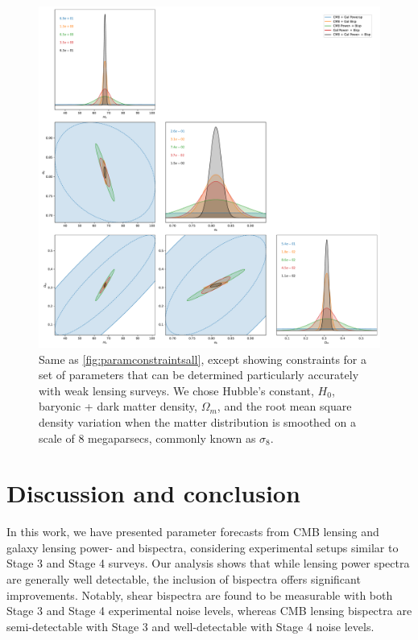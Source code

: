 \documentclass[11pt]{article} %
\begin{document}
\begin{figure}
    \centering
    \includegraphics[width=\textwidth]{figures/param_constraints_tight.pdf}
    \caption{Same as \ref{fig:paramconstraintsall}, except showing constraints for a set of parameters that can be determined particularly accurately with weak lensing surveys. We chose Hubble's constant, $H_0$, baryonic + dark matter density, $\Omega_m$, and the root mean square density variation when the matter distribution is smoothed on a scale of 8 megaparsecs, commonly known as $\sigma_8$.}
    \label{fig:paramconstraintstight}
\end{figure}

\pagebreak



\section{Discussion and conclusion}\label{sec:discussion}
In this work, we have presented parameter forecasts from CMB lensing and galaxy lensing power- and bispectra, considering experimental setups similar to Stage 3 and Stage 4 surveys. Our analysis shows that while lensing power spectra are generally well detectable, the inclusion of bispectra offers significant improvements. Notably, shear bispectra are found to be measurable with both Stage 3 and Stage 4 experimental noise levels, whereas CMB lensing bispectra are semi-detectable with Stage 3 and well-detectable with Stage 4 noise levels.
\end{document}

